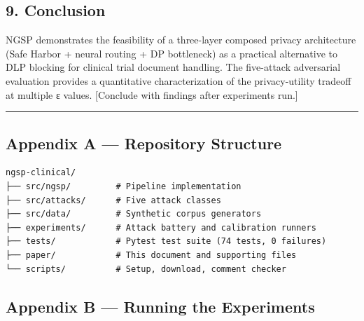 \subsection{9. Conclusion}\label{conclusion}

NGSP demonstrates the feasibility of a three-layer composed privacy
architecture (Safe Harbor + neural routing + DP bottleneck) as a
practical alternative to DLP blocking for clinical trial document
handling. The five-attack adversarial evaluation provides a quantitative
characterization of the privacy-utility tradeoff at multiple ε values.
{[}Conclude with findings after experiments run.{]}

\begin{center}\rule{0.5\linewidth}{0.5pt}\end{center}

\subsection{Appendix A --- Repository
Structure}\label{appendix-a-repository-structure}

\begin{verbatim}
ngsp-clinical/
├── src/ngsp/         # Pipeline implementation
├── src/attacks/      # Five attack classes
├── src/data/         # Synthetic corpus generators
├── experiments/      # Attack battery and calibration runners
├── tests/            # Pytest test suite (74 tests, 0 failures)
├── paper/            # This document and supporting files
└── scripts/          # Setup, download, comment checker
\end{verbatim}

\subsection{Appendix B --- Running the
Experiments}\label{appendix-b-running-the-experiments}

